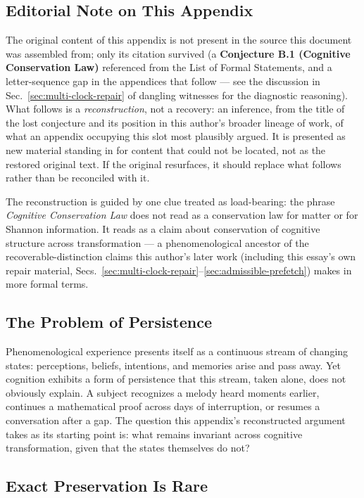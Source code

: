 \documentclass[12pt,a4paper]{article}
\theoremstyle{plain}
\theoremstyle{definition}
\theoremstyle{remark}
\begin{document}
\subsection*{Editorial Note on This Appendix}

The original content of this appendix is not present in the source this document was assembled from; only its citation survived (a \textbf{Conjecture B.1 (Cognitive Conservation Law)} referenced from the List of Formal Statements, and a letter-sequence gap in the appendices that follow — see the discussion in Sec.~\ref{sec:multi-clock-repair} of dangling witnesses for the diagnostic reasoning). What follows is a \emph{reconstruction}, not a recovery: an inference, from the title of the lost conjecture and its position in this author's broader lineage of work, of what an appendix occupying this slot most plausibly argued. It is presented as new material standing in for content that could not be located, not as the restored original text. If the original resurfaces, it should replace what follows rather than be reconciled with it.

The reconstruction is guided by one clue treated as load-bearing: the phrase \emph{Cognitive Conservation Law} does not read as a conservation law for matter or for Shannon information. It reads as a claim about conservation of cognitive structure across transformation — a phenomenological ancestor of the recoverable-distinction claims this author's later work (including this essay's own repair material, Secs.~\ref{sec:multi-clock-repair}--\ref{sec:admissible-prefetch}) makes in more formal terms.

\subsection{The Problem of Persistence}
\label{subsec:phen-persistence}

Phenomenological experience presents itself as a continuous stream of changing states: perceptions, beliefs, intentions, and memories arise and pass away. Yet cognition exhibits a form of persistence that this stream, taken alone, does not obviously explain. A subject recognizes a melody heard moments earlier, continues a mathematical proof across days of interruption, or resumes a conversation after a gap. The question this appendix's reconstructed argument takes as its starting point is: what remains invariant across cognitive transformation, given that the states themselves do not?

\subsection{Exact Preservation Is Rare}
\label{subsec:phen-exact-rare}
\end{document}
